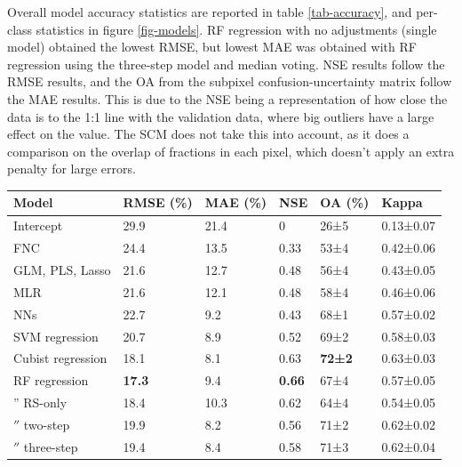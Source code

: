 \documentclass[review,authoryear,3p]{elsarticle}
\begin{document}
Overall model accuracy statistics are reported in table \ref{tab-accuracy}, and per-class statistics in figure \ref{fig-models}.
\Gls{RF} regression with no adjustments (single model) obtained the lowest \gls{RMSE}, but lowest \gls{MAE} was obtained with \gls{RF} regression using the three-step model and median voting.
\gls{NSE} results follow the \gls{RMSE} results, and the \gls{OA} from the subpixel confusion-uncertainty matrix follow the \gls{MAE} results.
This is due to the \gls{NSE} being a representation of how close the data is to the 1:1 line with the validation data, where big outliers have a large effect on the value.
The \gls{SCM} does not take this into account, as it does a comparison on the overlap of fractions in each pixel, which doesn't apply an extra penalty for large errors.

\begin{table}
\centering
\begin{tabular}{llllll}
\toprule
\textbf{Model} & \textbf{\ac{RMSE} (\%)} & \textbf{\ac{MAE} (\%)} & \textbf{\acrshort{NSE}} & \textbf{\ac{OA} (\%)} & \textbf{Kappa} \\
\midrule
Intercept
& 29.9  & 21.4  & 0     & 26±5  & 0.13±0.07 \\
\Gls{FNC}
& 24.4  & 13.5  & 0.33  & 53±4  & 0.42±0.06 \\
\Gls{GLM}, \Gls{PLS}, Lasso
& 21.6  & 12.7  & 0.48  & 56±4  & 0.43±0.05 \\
\Gls{MLR}
& 21.6  & 12.1  & 0.48  & 58±4  & 0.46±0.06 \\
\Glspl{NN}
& 22.7  & 9.2   & 0.43  & 68±1  & 0.57±0.02 \\
\Gls{SVM} regression
& 20.7  & 8.9   & 0.52  & 69±2  & 0.58±0.03 \\
Cubist regression
& 18.1  & 8.1   & 0.63  & \textbf{72±2}  & 0.63±0.03 \\
\Gls{RF} regression
& \textbf{17.3}  & 9.4   & \textbf{0.66}  & 67±4  & 0.57±0.05 \\
{''} RS-only
& 18.4  & 10.3  & 0.62  & 64±4  & 0.54±0.05 \\
\ensuremath{''} two-step
& 19.9  & 8.2   & 0.56  & 71±2  & 0.62±0.02 \\
\ensuremath{''} three-step
& 19.4  & 8.4   & 0.58  & 71±3  & 0.62±0.04 \\

\end{tabular}
\end{table}
\end{document}
